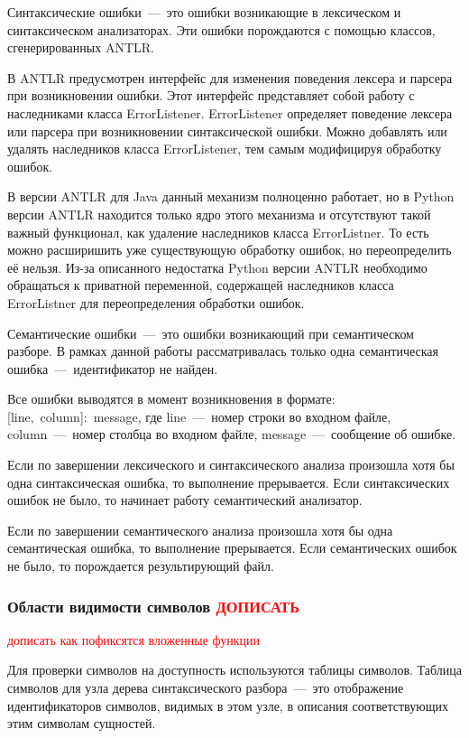 \documentclass[12pt,a4paper,oneside]{extarticle}
\begin{document}
            Синтаксические ошибки~---~это ошибки возникающие в лексическом и синтаксическом анализаторах.
            Эти ошибки порождаются с помощью классов, сгенерированных ANTLR.

            В ANTLR предусмотрен интерфейс для изменения поведения лексера и парсера при возникновении ошибки.
            Этот интерфейс представляет собой работу с наследниками класса ErrorListener.
            ErrorListener определяет поведение лексера или парсера при возникновении синтаксической ошибки.
            Можно добавлять или удалять наследников класса ErrorListener, тем самым модифицируя обработку ошибок.

            В версии ANTLR для Java данный механизм полноценно работает, но в Python версии ANTLR находится только ядро этого механизма и отсутствуют такой важный функционал, как удаление наследников класса ErrorListner.
            То есть можно расширишить уже существующую обработку ошибок, но переопределить её нельзя.
            Из-за описанного недостатка Python версии ANTLR необходимо обращаться к приватной переменной, содержащей наследников класса ErrorListner для переопределения обработки ошибок.

            Семантические ошибки~---~это ошибки возникающий при семантическом разборе. В рамках данной работы рассматривалась только одна семантическая ошибка~---~идентификатор не найден.

            Все ошибки выводятся в момент возникновения в формате: [line,~column]:~message, где line~---~номер строки во входном файле, column~---~номер столбца во входном файле, message~---~сообщение об ошибке.

            Если по завершении лексического и синтаксического анализа произошла хотя бы одна синтаксическая ошибка, то выполнение прерывается. Если синтаксических ошибок не было, то начинает работу семантический анализатор. 

            Если по завершении семантического анализа произошла хотя бы одна семантическая ошибка, то выполнение прерывается. Если семантических ошибок не было, то порождается результирующий файл.

        \subsubsection{Области видимости символов \textcolor{red}{ДОПИСАТЬ}}
            \textcolor{red}{дописать как пофиксятся вложенные функции}

            Для проверки символов на доступность используются таблицы символов.
            Таблица символов для узла дерева синтаксического разбора~---~это отображение идентификаторов символов, видимых в этом узле, в описания соответствующих этим символам сущностей.
\end{document}
